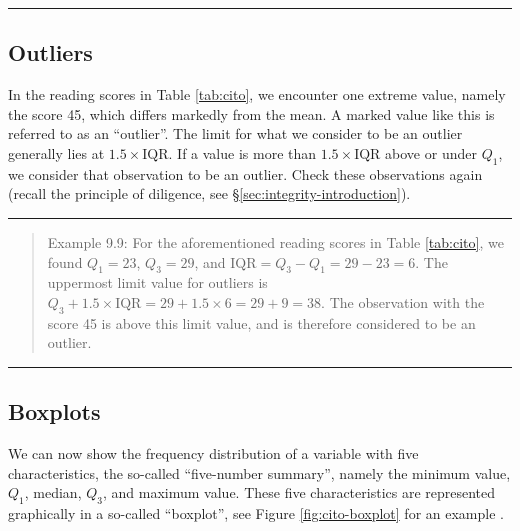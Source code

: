 \documentclass[
]{book}
\begin{document}
\begin{center}\rule{0.5\linewidth}{0.5pt}\end{center}

\hypertarget{sec:outliers}{%
\subsection{Outliers}\label{sec:outliers}}

In the reading scores in Table \ref{tab:cito}, we encounter one extreme value, namely the score
45, which differs markedly from the mean. A marked value like this is referred to as an
``outlier''. The limit for what we consider to be an outlier
generally lies at \(1.5 \times \textrm{IQR}\). If a value is more than
\(1.5 \times \textrm{IQR}\) above or under \(Q_1\), we consider that
observation to be an outlier. Check these observations again (recall the principle of
diligence, see §\ref{sec:integrity-introduction}).

\begin{center}\rule{0.5\linewidth}{0.5pt}\end{center}

\begin{quote}
Example 9.9:
For the aforementioned reading scores in
Table \ref{tab:cito}, we found
\(Q_1=23\), \(Q_3=29\), and \(\textrm{IQR}=Q_3-Q_1=29-23=6\). The uppermost
limit value for outliers is
\(Q_3 + 1.5 \times \textrm{IQR} = 29 + 1.5 \times 6 = 29+9 = 38\). The
observation with the score 45 is above this limit value, and is therefore
considered to be an outlier.
\end{quote}

\begin{center}\rule{0.5\linewidth}{0.5pt}\end{center}

\hypertarget{sec:boxplot}{%
\subsection{Boxplots}\label{sec:boxplot}}

We can now show the frequency distribution of a variable with five
characteristics, the so-called ``five-number summary'', namely the minimum value, \(Q_1\),
median, \(Q_3\), and maximum value. These five characteristics are represented graphically
in a so-called ``boxplot'', see
Figure \ref{fig:cito-boxplot}
for an example \citep[ §2C]{Tukey77}.
\end{document}
